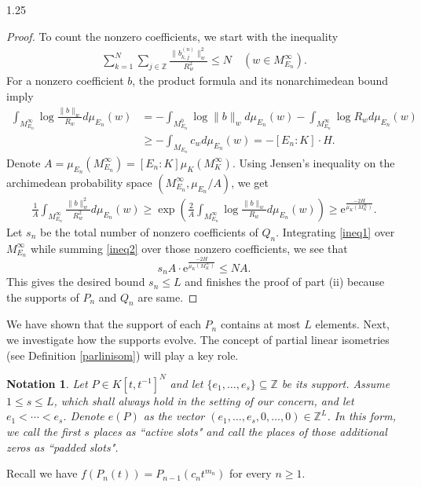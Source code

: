 \documentclass[12pt]{article}
\newtheorem{notation}[definition]{Notation}
\begin{document}
\begin{spacing}{1.25}
\begin{proof}
To count the nonzero coefficients, we start with the inequality
\begin{align}\label{ineq1}
\sum\limits_{k=1}^N\sum\limits_{j\in\mathbb{Z}}\frac{\|b_{k,j}^{(n)}\|_w^2}{R_w^2}\leq N\quad(w\in M_{E_n}^{\infty}).
\end{align}
For a nonzero coefficient $b$, the product formula and its nonarchimedean bound imply
\begin{align*}
\int_{M_{E_n}^{\infty}}\log\frac{\|b\|_w}{R_w}d\mu_{E_n}(w)
&=-\int_{M_{E_n}^0}\log\|b\|_wd\mu_{E_n}(w)-\int_{M_{E_n}^{\infty}}\log R_wd\mu_{E_n}(w) \\
&\geq-\int_{M_{E_n}}c_wd\mu_{E_n}(w)=-[E_n:K]\cdot H.
\end{align*}
Denote $A=\mu_{E_n}(M_{E_n}^{\infty})=[E_n:K]\mu_K(M_K^{\infty})$. Using Jensen's inequality on the archimedean probability space $(M_{E_n}^{\infty},\mu_{E_n}/A)$, we get
\begin{align}\label{ineq2}
\frac{1}{A}\int_{M_{E_n}^{\infty}}\frac{\|b\|_w^2}{R_w^2}d\mu_{E_n}(w)\geq\exp\left(\frac{2}{A}\int_{M_{E_n}^{\infty}}\log\frac{\|b\|_w}{R_w}d\mu_{E_n}(w)\right)\geq\mathrm{e}^{\frac{-2H}{\mu_K(M_K^{\infty})}}.
\end{align}
Let $s_n$ be the total number of nonzero coefficients of $Q_n$. Integrating \eqref{ineq1} over $M_{E_n}^{\infty}$ while summing \eqref{ineq2} over those nonzero coefficients, we see that
$$
s_nA\cdot\mathrm{e}^{\frac{-2H}{\mu_K(M_K^{\infty})}}\leq NA.
$$
This gives the desired bound $s_n\leq L$ and finishes the proof of part (ii) because the supports of $P_n$ and $Q_n$ are same.
\end{proof}

We have shown that the support of each $P_n$ contains at most $L$ elements. Next, we investigate how the supports evolve. The concept of partial linear isometries (see Definition \ref{parlinisom}) will play a key role.

\begin{notation}\label{eP}
Let $P\in K[t,t^{-1}]^N$ and let $\{e_1,\dots,e_s\}\subseteq\mathbb{Z}$ be its support. Assume $1\leq s\leq L$, which shall always hold in the setting of our concern, and let $e_1<\cdots<e_s$. Denote $e(P)$ as the vector $(e_1,\dots,e_s,0,\dots,0)\in\mathbb{Z}^L$. In this form, we call the first $s$ places as ``active slots" and call the places of those additional zeros as ``padded slots".
\end{notation}

Recall we have $f(P_n(t))=P_{n-1}(c_nt^{m_n})$ for every $n\geq1$.


\end{spacing}
\end{document}
